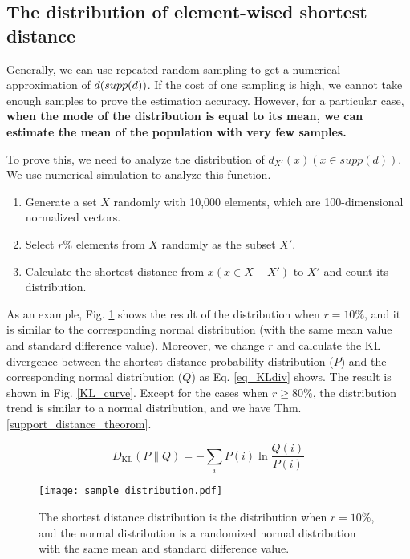 \documentclass[letterpaper]{article} %
\begin{document}
\subsection{The distribution of element-wised shortest distance}
Generally, we can use repeated random sampling to get a numerical approximation of $\Bar{d}(supp(d))$. If the cost of one sampling is high, we cannot take enough samples to prove the estimation accuracy. However, for a particular case, \textbf{when the mode of the distribution is equal to its mean, we can estimate the mean of the population with very few samples.}

To prove this, we need to analyze the distribution of $d_{X'}(x) (x \in supp(d))$. We use numerical simulation to analyze this function.
\begin{enumerate}
    \item Generate a set $X$ randomly with 10,000 elements, which are 100-dimensional normalized vectors.
    \item Select $r\%$ elements from $X$ randomly as the subset $X'$.
    \item Calculate the shortest distance from $x (x \in X-X')$ to $X'$ and count its distribution.
\end{enumerate}

As an example, Fig. \ref{Distribution_sample} shows the result of the distribution when $r = 10\%$, and it is similar to the corresponding normal distribution (with the same mean value and standard difference value). Moreover, we change $r$ and calculate the KL divergence \cite{kullback1951information} between the shortest distance probability distribution ($P$) and the corresponding normal distribution ($Q$) as Eq. \ref{eq_KLdiv} shows. The result is shown in Fig. \ref{KL_curve}. Except for the cases when $r \geq 80\% $, the distribution trend is similar to a normal distribution, and we have Thm. \ref{support_distance_theorom}.

\begin{equation}
    D_{\mathrm{KL}}(P \| Q)=-\sum_{i} P(i) \ln \frac{Q(i)}{P(i)}
    \label{eq_KLdiv}
\end{equation}

\begin{figure}[p]
    \centering
    \texttt{[image: sample\_distribution.pdf]}
    \caption{The shortest distance distribution is the distribution when $r = 10\%$, and the normal distribution is a randomized normal distribution with the same mean and standard difference value.}
    \label{Distribution_sample}
\end{figure}
\end{document}
